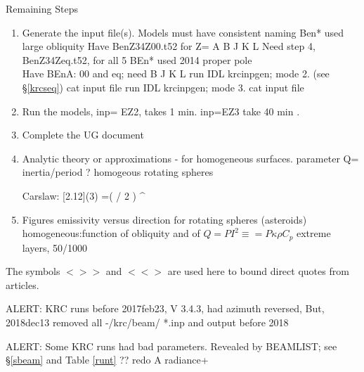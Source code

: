 \documentclass{article}
\newcommand{\bq}{$ < \! > \!   \! >$ } %
\newcommand{\eq}{ $< \! \! < \! > $ } %
\begin{document}
Remaining Steps \begin{enumerate}    %
 \item Generate the input file(s). Models must have consistent naming
\qi Ben* used large obliquity
\qii Have BenZ34Z00.t52 for  Z= A B J K L
\qii Need step 4, BenZ34Zeq.t52, for all 5
\qi BEn* used 2014 proper pole
\\ Have BEnA: 00 and eq; need B J K L
\qi run IDL krcinpgen;  mode 2. (see \S \ref{krcseq}) cat input file
\qi run IDL krcinpgen;  mode 3.  cat input file
 \item Run the models, inp= EZ2, takes 1 min.  inp=EZ3 take 40 min .
 \item Complete the UG document

\item Analytic theory or approximations
\qi -  for homogeneous surfaces.  parameter Q= inertia/period ? 
\qi homogeous rotating spheres

Carslaw: [2.12](3) \qb {}=\left( \omega/ 2 \kappa \right) ^{} \qe

\item Figures
\qi emissivity versus direction for rotating spheres (asteroids) 
\qii homogeneous:function of obliquity and of $Q=P I^2 \equiv=P \kappa\rho C_p $
\qii extreme layers, 50/1000
\end{enumerate}

The symbols \bq and \eq  are used here to bound direct quotes from articles.

ALERT: KRC runs before 2017feb23, V 3.4.3, had azimuth reversed,
\qi But, 2018dec13 removed all -/krc/beam/ *.inp and output before 2018

ALERT: Some KRC runs had bad parameters. Revealed by BEAMLIST; see \S \ref{sbeam} and Table \ref{runt}
\qi ??  redo A radiance+  

\end{document}
